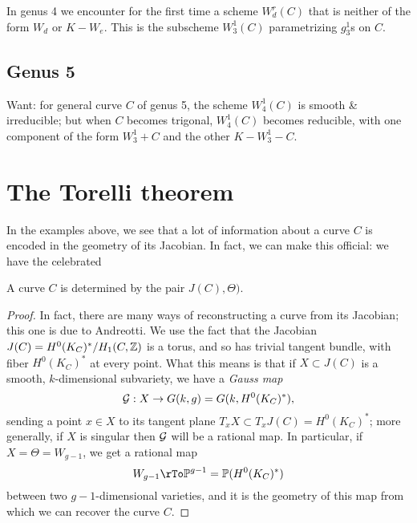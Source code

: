 In genus 4 we encounter for the first time a scheme $W^r_d(C)$ that is neither of the form $W_d$ or $K - W_e$. This is the subscheme $W^1_3(C)$ parametrizing $g^1_3$s on $C$.

\subsection{Genus 5}

Want: for general curve $C$ of genus 5, the scheme $W^1_4(C)$ is smooth \& irreducible; but when $C$ becomes trigonal, $W^1_4(C)$ becomes reducible, with one component of the form $W^1_3 + C$ and the other $K - W^1_3 - C$.



\section{The Torelli theorem}

In the examples above, we see that a lot of information about a curve $C$ is encoded in the geometry of its Jacobian. In fact, we can make this official: we have the celebrated

\begin{theorem}[Torelli]
A curve $C$ is determined by the pair $J(C), \Theta)$.
\end{theorem}

\begin{proof}
In fact, there are many ways of reconstructing a curve from its Jacobian; this one is  due to Andreotti. We use the fact that the Jacobian $J(C) = H^0(K_C)^*/H_1(C,\ZZ)$ is a torus, and so has trivial tangent bundle, with fiber $H^0(K_C)^*$ at every point. What this means is that if $X \subset J(C)$ is a smooth, $k$-dimensional subvariety, we have a \emph{Gauss map}
$$
\cG : X \to G(k, g) = G(k, H^0(K_C)^*),
$$
sending a point $x \in X$ to its tangent plane $T_xX \subset T_xJ(C) = H^0(K_C)^*$; more generally, if $X$ is singular then $\cG$ will be a rational map. In particular, if $X = \Theta = W_{g-1}$, we get a rational map
$$
W_{g-1} \rTo \PP^{g-1} = \PP(H^0(K_C)^*)
$$
between two $g-1$-dimensional varieties, and it is the geometry of this map from which we can recover the curve $C$.

\end{proof}




